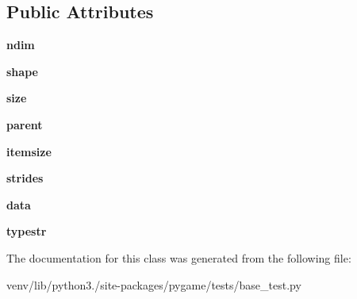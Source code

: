 \subsection*{Public Attributes}
\begin{DoxyCompactItemize}
\item 
\mbox{\label{classpygame_1_1tests_1_1base__test_1_1_base_module_test_1_1_exporter_base_a0c678d9f4665c522f29f97279667bf50}} 
{\bfseries ndim}
\item 
\mbox{\label{classpygame_1_1tests_1_1base__test_1_1_base_module_test_1_1_exporter_base_ac3ac21b8dec2a500fec4f878f3032551}} 
{\bfseries shape}
\item 
\mbox{\label{classpygame_1_1tests_1_1base__test_1_1_base_module_test_1_1_exporter_base_ad158815c865eed136d531d4eb91d03a1}} 
{\bfseries size}
\item 
\mbox{\label{classpygame_1_1tests_1_1base__test_1_1_base_module_test_1_1_exporter_base_a31015ce01a61a5ba6a9e01fc5d5dff05}} 
{\bfseries parent}
\item 
\mbox{\label{classpygame_1_1tests_1_1base__test_1_1_base_module_test_1_1_exporter_base_aaa88ed4f40a91e4477583c1bac0cbc30}} 
{\bfseries itemsize}
\item 
\mbox{\label{classpygame_1_1tests_1_1base__test_1_1_base_module_test_1_1_exporter_base_a05cc2f7d2a59a6ba302b65ac7f73a3ec}} 
{\bfseries strides}
\item 
\mbox{\label{classpygame_1_1tests_1_1base__test_1_1_base_module_test_1_1_exporter_base_a78ade93f8de26a9f42d51fb4253ae397}} 
{\bfseries data}
\item 
\mbox{\label{classpygame_1_1tests_1_1base__test_1_1_base_module_test_1_1_exporter_base_a9979fd81a75dd8e04aec74eeed5574eb}} 
{\bfseries typestr}
\end{DoxyCompactItemize}


The documentation for this class was generated from the following file\+:\begin{DoxyCompactItemize}
\item 
venv/lib/python3./site-\/packages/pygame/tests/base\+\_\+test.\+py\end{DoxyCompactItemize}
